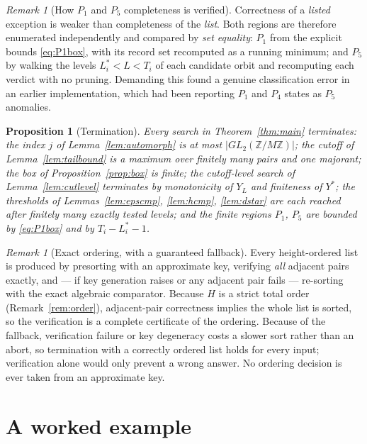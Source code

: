 \documentclass[11pt]{article}
\newtheorem{proposition}[theorem]{Proposition}
\theoremstyle{definition}
\theoremstyle{remark}
\newtheorem{remark}[theorem]{Remark}
\newcommand{\Z}{\mathbb{Z}}
\begin{document}
\begin{remark}[How $P_1$ and $P_5$ completeness is verified]\label{rem:completeness}
Correctness of a \emph{listed} exception is weaker than completeness of the \emph{list}. Both
regions are therefore enumerated independently and compared by \emph{set equality}: $P_1$ from
the explicit bounds \eqref{eq:P1box}, with its record set recomputed as a running minimum; and
$P_5$ by walking the levels $L_i^{*}<L<T_i$ of each candidate orbit and recomputing each verdict
with no pruning. Demanding this found a genuine classification error in an earlier
implementation, which had been reporting $P_1$ and $P_4$ states as $P_5$ anomalies.
\end{remark}

\begin{proposition}[Termination]\label{prop:term}
Every search in Theorem~\ref{thm:main} terminates: the index $j$ of
Lemma~\ref{lem:automorph} is at most $|GL_2(\Z/M\Z)|$; the cutoff of
Lemma~\ref{lem:tailbound} is a maximum over finitely many pairs and one majorant; the box of
Proposition~\ref{prop:box} is finite; the cutoff-level search of Lemma~\ref{lem:cutlevel}
terminates by monotonicity of $Y_L$ and finiteness of $Y^{*}$; the thresholds of
Lemmas~\ref{lem:epscmp}, \ref{lem:hcmp}, \ref{lem:dstar} are each reached after finitely many
exactly tested levels; and the finite regions $P_1$, $P_5$ are bounded by \eqref{eq:P1box} and
by $T_i-L_i^{*}-1$.
\end{proposition}

\begin{remark}[Exact ordering, with a guaranteed fallback]\label{rem:sort}
Every height-ordered list is produced by presorting with an approximate key, verifying
\emph{all} adjacent pairs exactly, and --- if key generation raises or any adjacent pair fails
--- re-sorting with the exact algebraic comparator. Because $H$ is a strict total order
(Remark~\ref{rem:order}), adjacent-pair correctness implies the whole list is sorted, so the
verification is a complete certificate of the ordering. Because of the fallback, verification
failure or key degeneracy costs a slower sort rather than an abort, so termination with a
correctly ordered list holds for every input; verification alone would only prevent a wrong
answer. No ordering decision is ever taken from an approximate key.
\end{remark}

\section{A worked example}\label{sec:example}
\end{document}
